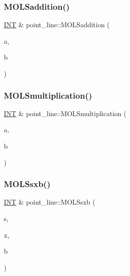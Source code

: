 \subsubsection{\texorpdfstring{M\+O\+L\+Saddition()}{MOLSaddition()}}
{\footnotesize\ttfamily \mbox{\hyperlink{galois_8h_a09fddde158a3a20bd2dcadb609de11dc}{I\+NT}} \& point\+\_\+line\+::\+M\+O\+L\+Saddition (\begin{DoxyParamCaption}\item[{\mbox{\hyperlink{galois_8h_a09fddde158a3a20bd2dcadb609de11dc}{I\+NT}}}]{a,  }\item[{\mbox{\hyperlink{galois_8h_a09fddde158a3a20bd2dcadb609de11dc}{I\+NT}}}]{b }\end{DoxyParamCaption})}

\mbox{\label{classpoint__line_a0779a8ab6911ee509bd1b947733cde3b}} 
\subsubsection{\texorpdfstring{M\+O\+L\+Smultiplication()}{MOLSmultiplication()}}
{\footnotesize\ttfamily \mbox{\hyperlink{galois_8h_a09fddde158a3a20bd2dcadb609de11dc}{I\+NT}} \& point\+\_\+line\+::\+M\+O\+L\+Smultiplication (\begin{DoxyParamCaption}\item[{\mbox{\hyperlink{galois_8h_a09fddde158a3a20bd2dcadb609de11dc}{I\+NT}}}]{a,  }\item[{\mbox{\hyperlink{galois_8h_a09fddde158a3a20bd2dcadb609de11dc}{I\+NT}}}]{b }\end{DoxyParamCaption})}

\mbox{\label{classpoint__line_ae4d23004dc4a9cd50b3ed317e1fb8009}} 
\subsubsection{\texorpdfstring{M\+O\+L\+Ssxb()}{MOLSsxb()}}
{\footnotesize\ttfamily \mbox{\hyperlink{galois_8h_a09fddde158a3a20bd2dcadb609de11dc}{I\+NT}} \& point\+\_\+line\+::\+M\+O\+L\+Ssxb (\begin{DoxyParamCaption}\item[{\mbox{\hyperlink{galois_8h_a09fddde158a3a20bd2dcadb609de11dc}{I\+NT}}}]{s,  }\item[{\mbox{\hyperlink{galois_8h_a09fddde158a3a20bd2dcadb609de11dc}{I\+NT}}}]{x,  }\item[{\mbox{\hyperlink{galois_8h_a09fddde158a3a20bd2dcadb609de11dc}{I\+NT}}}]{b }\end{DoxyParamCaption})}

